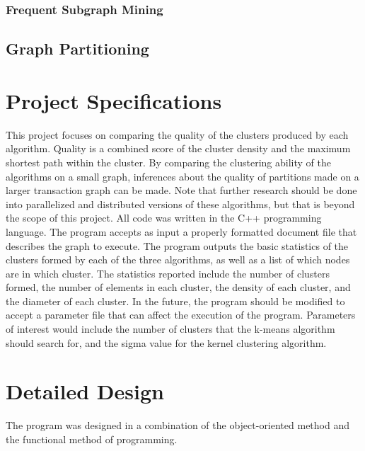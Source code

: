 \documentclass[12pt]{article}
\begin{document}
\subsubsection{Frequent Subgraph Mining}

\subsection{Graph Partitioning}

\newpage
\section{Project Specifications}
This project focuses on comparing the quality of the clusters produced by each algorithm. Quality is a combined score  of the cluster density and the maximum shortest path within the cluster. By comparing the clustering ability of the algorithms on a small graph, inferences about the quality of partitions made on a larger transaction graph can be made. Note that further research should be done into parallelized and distributed versions of these algorithms, but that is beyond the scope of this project.
\newline\newline
All code was written in the C++ programming language. The program accepts as input a properly formatted document file that describes the graph to execute. The program outputs the basic statistics of the clusters formed by each of the three algorithms, as well as a list of which nodes are in which cluster. The statistics reported include the number of clusters formed, the number of elements in each cluster, the density of each cluster, and the diameter of each cluster.
\newline\newline
In the future, the program should be modified to accept a parameter file that can affect the execution of the program. Parameters of interest would include the number of clusters that the k-means algorithm should search for, and the sigma value for the kernel clustering algorithm.

\newpage
\section{Detailed Design}
The program was designed in a combination of the object-oriented method and the functional method of programming.
\end{document}
